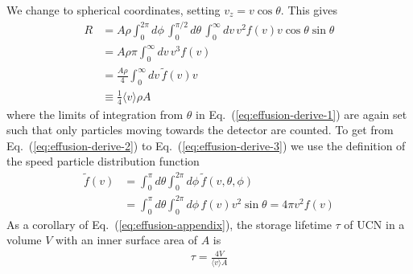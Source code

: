 We change to spherical coordinates, setting $v_z = v\cos \theta$. This gives
%
\begin{align}
    R &= A \rho \int^{2\pi}_0 d\phi \, \int^{\pi/2}_0 d\theta \, \int^\infty_0 dv \, v^2 f(v) v \cos \theta \sin \theta \label{eq:effusion-derive-1} \\
    &= A \rho \pi \int^\infty_0 dv \, v^3 f(v) \label{eq:effusion-derive-2} \\
    &= \frac{A\rho}{4} \int^\infty_0 dv \, \tilde{f}(v)v \label{eq:effusion-derive-3} \\
    &\equiv \frac{1}{4}\langle v \rangle \rho A
\end{align}
%
where the limits of integration from $\theta$ in Eq.~(\ref{eq:effusion-derive-1}) are again set such that only particles moving towards the detector are counted. To get from Eq.~(\ref{eq:effusion-derive-2}) to Eq.~(\ref{eq:effusion-derive-3}) we use the definition of the speed particle distribution function
%
\begin{align}
    \tilde{f}(v) &= \int^\pi_0 d\theta \int^{2\pi}_0 d\phi \, \tilde{f}(v,\theta,\phi) \\
    &= \int^\pi_0 d\theta \int^{2\pi}_0 d\phi \, f(v)v^2\sin \theta = 4\pi v^2 f(v)
\end{align}
%
As a corollary of Eq.~(\ref{eq:effusion-appendix}), the storage lifetime $\tau$ of UCN in a volume $V$ with an inner surface area of $A$ is
%
\begin{gather}
    \tau=\frac{4V}{\langle v \rangle A}\label{eq:effusion-lifetime}
\end{gather}

